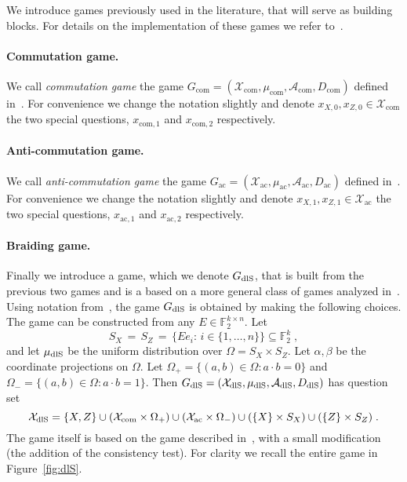 \documentclass[11pt]{article}
\theoremstyle{definition}
\newcommand{\field}{\mathbb{F}_2}
\newcommand{\dlS}{\ensuremath{\rm dlS}}
\newcommand{\F}{\ensuremath{\mathbb{F}}}
\newcommand{\mA}{\ensuremath{\mathcal{A}}}
\newcommand{\mX}{\ensuremath{\mathcal{X}}}
\newcommand{\cc}{\mathrm{com}}
\newcommand{\ac}{\mathrm{ac}}
\begin{document}
We introduce games previously used in the literature, that will serve as building blocks. For details on the implementation of these games we refer to~\cite{de2022spectral}.

\paragraph{Commutation game.}
We call \emph{commutation game} the game $G_{\cc}=(\mX_\cc,\mu_\cc,\mA_\cc,D_\cc)$ defined in~\cite[Section 3.1]{de2022spectral}. For convenience we change the notation slightly and denote $x_{X,0}, x_{Z,0} \in \mX_{\cc}$ the two special questions, $x_{\cc,1}$ and $x_{\cc,2}$ respectively. 

\paragraph{Anti-commutation game.}
We call \emph{anti-commutation game} the game $G_\ac=(\mX_\ac,\mu_\ac,\mA_\ac,D_\ac)$ defined in~\cite[Section 3.2]{de2022spectral}. For convenience we change the notation slightly and  denote $x_{X,1}, x_{Z,1} \in \mX_{\ac}$ the two special questions, $x_{\ac,1}$ and $x_{\ac,2}$ respectively. 

\paragraph{Braiding game.}
Finally we introduce a game, which we denote $G_{\dlS}$, that is built from the previous two games and is a based on a more general class of games analyzed in~\cite[Section 3.4]{de2022spectral}.  Using notation from~\cite{de2022spectral}, the game $G_{\dlS}$ is obtained by making the following choices. The game can be constructed from any $E\in\F_2^{k\times n}$. Let 
\begin{equation}\label{eq:dls-sets}
 S_X\,=\,S_Z\,=\,\{E e_i:\,i\in\{1,\ldots,n\}\}\subseteq \field^k\;,
\end{equation}
and let $\mu_{\dlS}$ be the uniform distribution over $\Omega=S_X\times S_Z$. Let $\alpha,\beta$ be the coordinate projections on $\Omega$. Let $\Omega_+ = \{(a,b)\in \Omega:a\cdot b=0\}$ and $\Omega_-=\{(a,b)\in\Omega:a\cdot b=1\}$. Then $G_{\dlS}=(\mX_{\dlS},\mu_{\dlS},\mA_{\dlS},D_{\dlS})$ has question set 
\[ \mX_{\dlS} = \{X,Z\} \cup (\mX_{\cc}\times \Omega_+) \cup (\mX_{\ac} \times \Omega_-) \cup (\{X\}\times S_X) \cup (\{Z\}\times S_Z)\;.\]
The game itself is based on the game described in~\cite[Section 3.4]{de2022spectral}, with a small modification (the addition of the consistency test). For clarity we recall the entire game in Figure~\ref{fig:dlS}. 
\end{document}
